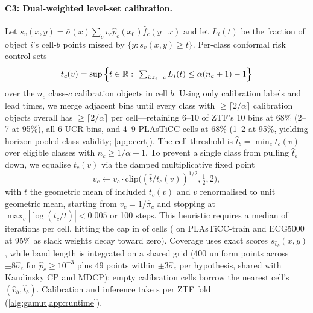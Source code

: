 \paragraph{C3: Dual-weighted level-set calibration.}
Let $s_v(x,y)=\bar\sigma(x)\sum_c v_c\hat p_c(x_0)\hat f_c(y\mid x)$ and let $L_i(t)$ be the fraction of object $i$'s cell-$b$ points missed by $\{y:s_v(x,y)\ge t\}$.
Per-class conformal risk control \citep{angelopoulos2024conformal} sets
\begin{equation}
\label{eq:crc}
t_{c}(v)=\sup\Big\{t\in\mathbb{R}:\ \textstyle\sum_{i:z_i=c}L_i(t)\le \alpha(n_{c}+1)-1\Big\}
\end{equation}
over the $n_c$ class-$c$ calibration objects in cell $b$.
Using only calibration labels and lead times, we merge adjacent bins until every class with $\ge\lceil2/\alpha\rceil$ calibration objects overall has $\ge\lceil2/\alpha\rceil$ per cell---retaining 6--10 of ZTF's 10 bins at 68\% (2--7 at 95\%), all 6 UCR bins, and 4--9 PLAsTiCC cells at 68\% (1--2 at 95\%, yielding horizon-pooled class validity; \cref{app:cert}).
The cell threshold is $\hat t_b=\min_c t_c(v)$ over eligible classes with $n_c\ge 1/\alpha-1$.
To prevent a single class from pulling $\hat t_b$ down, we equalise $t_c(v)$ via the damped multiplicative fixed point
\begin{equation}
\label{eq:dual}
v_c\leftarrow v_c\cdot\mathrm{clip}\big((\bar t/t_c(v))^{1/2},\tfrac12,2\big),
\end{equation}
with $\bar t$ the geometric mean of included $t_c(v)$ and $v$ renormalised to unit geometric mean, starting from $v_c=1/\hat\pi_c$ and stopping at $\max_c|\log(t_c/\bar t)|<0.005$ or 100 steps.
This heuristic requires a median of \DualItersMedian{} iterations per cell, hitting the cap in \DualItersCapPct{} of cells (\DualItersCapSmall{} on PLAsTiCC-train and ECG5000 at 95\% as slack weights decay toward zero).
Coverage uses exact scores $s_{\hat v_b}(x,y)$, while band length is integrated on a shared grid (400 uniform points across $\pm8\hat\sigma_c$ for $\hat p_c\ge10^{-3}$ plus 49 points within $\pm3\hat\sigma_c$ per hypothesis, shared with Kandinsky CP and MDCP); empty calibration cells borrow the nearest cell's $(\hat v_b,\hat t_b)$.
Calibration and inference take \RuntimeGamutZTF{}s per ZTF fold (\cref{alg:gamut,app:runtime}).

